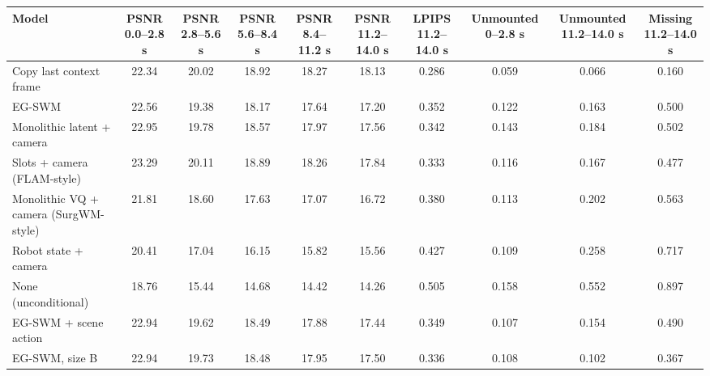 \begin{tabular}{lccccccccc}
\toprule
Model & PSNR 0.0--2.8 s & PSNR 2.8--5.6 s & PSNR 5.6--8.4 s & PSNR 8.4--11.2 s & PSNR 11.2--14.0 s & LPIPS 11.2--14.0 s & Unmounted 0--2.8 s & Unmounted 11.2--14.0 s & Missing 11.2--14.0 s \\
\midrule
Copy last context frame & 22.34 & 20.02 & 18.92 & 18.27 & 18.13 & 0.286 & 0.059 & 0.066 & 0.160 \\
EG-SWM & 22.56 & 19.38 & 18.17 & 17.64 & 17.20 & 0.352 & 0.122 & 0.163 & 0.500 \\
Monolithic latent + camera & 22.95 & 19.78 & 18.57 & 17.97 & 17.56 & 0.342 & 0.143 & 0.184 & 0.502 \\
Slots + camera (FLAM-style) & 23.29 & 20.11 & 18.89 & 18.26 & 17.84 & 0.333 & 0.116 & 0.167 & 0.477 \\
Monolithic VQ + camera (SurgWM-style) & 21.81 & 18.60 & 17.63 & 17.07 & 16.72 & 0.380 & 0.113 & 0.202 & 0.563 \\
Robot state + camera & 20.41 & 17.04 & 16.15 & 15.82 & 15.56 & 0.427 & 0.109 & 0.258 & 0.717 \\
None (unconditional) & 18.76 & 15.44 & 14.68 & 14.42 & 14.26 & 0.505 & 0.158 & 0.552 & 0.897 \\
EG-SWM + scene action & 22.94 & 19.62 & 18.49 & 17.88 & 17.44 & 0.349 & 0.107 & 0.154 & 0.490 \\
EG-SWM, size B & 22.94 & 19.73 & 18.48 & 17.95 & 17.50 & 0.336 & 0.108 & 0.102 & 0.367 \\
\bottomrule
\end{tabular}
